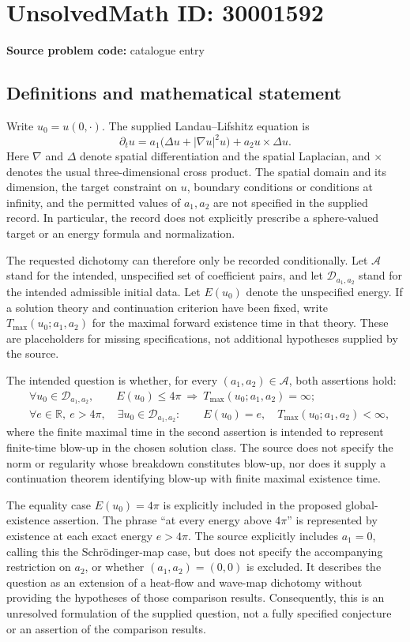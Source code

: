\documentclass[11pt]{article}
\newcommand{\R}{\mathbb{R}}
\begin{document}
\section*{UnsolvedMath ID: 30001592}
\textbf{Source problem code:} catalogue entry
\subsection{Definitions and mathematical statement}
Write \(u_0=u(0,\cdot)\). The supplied Landau--Lifshitz equation is
\[
\partial_tu=a_1\bigl(\Delta u+|\nabla u|^2u\bigr)+a_2u\times\Delta u.
\]
Here \(\nabla\) and \(\Delta\) denote spatial differentiation and the spatial Laplacian, and \(\times\) denotes the usual three-dimensional cross product. The spatial domain and its dimension, the target constraint on \(u\), boundary conditions or conditions at infinity, and the permitted values of \(a_1,a_2\) are not specified in the supplied record. In particular, the record does not explicitly prescribe a sphere-valued target or an energy formula and normalization.

The requested dichotomy can therefore only be recorded conditionally. Let \(\mathcal A\) stand for the intended, unspecified set of coefficient pairs, and let \(\mathcal D_{a_1,a_2}\) stand for the intended admissible initial data. Let \(E(u_0)\) denote the unspecified energy. If a solution theory and continuation criterion have been fixed, write \(T_{\max}(u_0;a_1,a_2)\) for the maximal forward existence time in that theory. These are placeholders for missing specifications, not additional hypotheses supplied by the source.

The intended question is whether, for every \((a_1,a_2)\in\mathcal A\), both assertions hold:
\[
\begin{aligned}
&\forall u_0\in\mathcal D_{a_1,a_2},\qquad
E(u_0)\leq4\pi
\ \Longrightarrow\
T_{\max}(u_0;a_1,a_2)=\infty;\\
&\forall e\in\R,\ e>4\pi,\quad
\exists u_0\in\mathcal D_{a_1,a_2}:\qquad
E(u_0)=e,\quad T_{\max}(u_0;a_1,a_2)<\infty,
\end{aligned}
\]
where the finite maximal time in the second assertion is intended to represent finite-time blow-up in the chosen solution class. The source does not specify the norm or regularity whose breakdown constitutes blow-up, nor does it supply a continuation theorem identifying blow-up with finite maximal existence time.

The equality case \(E(u_0)=4\pi\) is explicitly included in the proposed global-existence assertion. The phrase ``at every energy above \(4\pi\)'' is represented by existence at each exact energy \(e>4\pi\). The source explicitly includes \(a_1=0\), calling this the Schr\"odinger-map case, but does not specify the accompanying restriction on \(a_2\), or whether \((a_1,a_2)=(0,0)\) is excluded. It describes the question as an extension of a heat-flow and wave-map dichotomy without providing the hypotheses of those comparison results. Consequently, this is an unresolved formulation of the supplied question, not a fully specified conjecture or an assertion of the comparison results.
\end{document}
